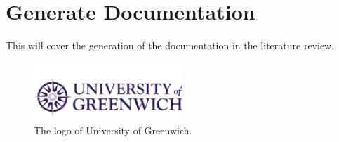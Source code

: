 \section{Generate Documentation}
\label{s:Generate-Documentation}
This will cover the generation of the documentation in the literature review.
\begin{figure}[ht]
	\centering
	\includegraphics[width=0.5\textwidth]{figures/greenwich-logo}
	\caption{The logo of University of Greenwich.}
	\label{f:Greenwich-Logo}
\end{figure}
